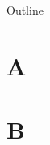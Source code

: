 \documentclass{beamer}
\begin{document}
\begin{frame}{Outline}
\tableofcontents
\end{frame}

\section{A}
\begin{frame}
\end{frame}

\section{B}
\begin{frame}
\end{frame}
\end{document}
